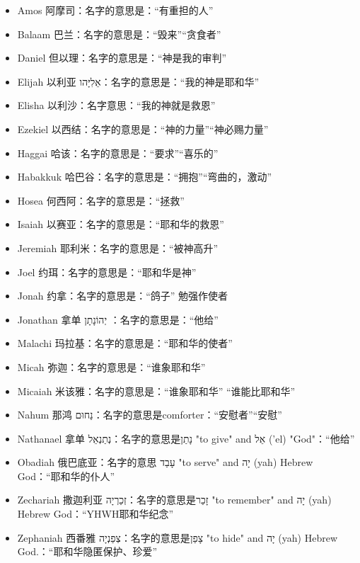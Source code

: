 \begin{itemize}
\itemsep-.45em
\item Amos  阿摩司：名字的意思是：“有重担的人”
\item Balaam  巴兰：名字的意思是：“毁来”“贪食者”
\item Daniel 但以理：名字的意思是：“神是我的审判”
\item Elijah 以利亚 אֵלִיָּהו：名字的意思是：“我的神是耶和华”
\item Elisha 以利沙：名字意思：“我的神就是救恩”
\item Ezekiel 以西结：名字的意思是：“神的力量”“神必赐力量”
\item Haggai 哈该：名字的意思是：“要求”“喜乐的”
\item Habakkuk 哈巴谷：名字的意思是：“拥抱”“弯曲的，激动”
\item Hosea 何西阿：名字的意思是：“拯救”
\item Isaiah 以赛亚：名字的意思是：“耶和华的救恩”
\item Jeremiah 耶利米：名字的意思是：“被神高升”
\item Joel 约珥：名字的意思是：“耶和华是神”
\item Jonah 约拿：名字的意思是：“鸽子” 勉强作使者
\item Jonathan 拿单 יְהוֹנָתָן‬‎ ：名字的意思是：“他给”
\item Malachi 玛拉基：名字的意思是：“耶和华的使者”
\item Micah 弥迦：名字的意思是：“谁象耶和华”
\item Micaiah 米该雅：名字的意思是：“谁象耶和华” “谁能比耶和华”
\item Nahum 那鸿 נַחוּם：名字的意思是comforter：“安慰者”“安慰”
\item Nathanael 拿单 נְתַנְאֵל：名字的意思是נָתַן  "to give" and אֵל ('el) "God"：“他给”
\item Obadiah 俄巴底亚：名字的意思 עָבַד "to serve" and יָה (yah) Hebrew God：“耶和华的仆人”
\item Zechariah 撒迦利亚 זְכַרְיָה：名字的意思是זָכַר "to remember" and יָה (yah) Hebrew God：“YHWH耶和华纪念”
\item Zephaniah 西番雅  צְפַנְיָה：名字的意思是צָפַן  "to hide" and יָה (yah) Hebrew God.：“耶和华隐匿保护、珍爱”
\end{itemize}


